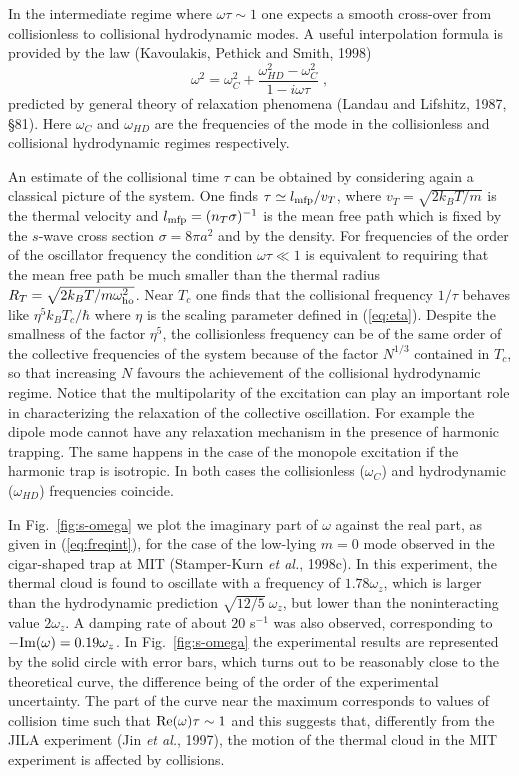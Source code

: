 In the intermediate regime where $\omega\tau\sim 1$ one expects a smooth
cross-over from collisionless to collisional hydrodynamic modes. A useful 
interpolation  formula is provided by  the law (Kavoulakis, Pethick 
and Smith, 1998)
\begin{equation}
\omega^2 = \omega_C^2 + \frac{\omega_{HD}^2-\omega_C^2}{1-i\omega\tau} \;,
\label{eq:freqint}
\end{equation}
predicted by general theory of relaxation phenomena (Landau and Lifshitz, 
1987, \S 81). Here $\omega_C$ and $\omega_{HD}$ are the frequencies of the 
mode in the collisionless and collisional hydrodynamic regimes respectively. 

An estimate of the collisional time  $\tau$ can be obtained by
considering again  a classical picture of the system. One finds $\tau
\simeq l_{\rm mfp}/v_T$, where $v_T=\sqrt{2k_BT/m}$ is the thermal 
velocity and $l_{\rm mfp}=(n_T\sigma)^{-1}$ is the mean free path
which is fixed by the $s$-wave cross section $\sigma=8\pi a^2$ and by
the density. For frequencies of the order of the oscillator frequency
the condition $\omega\tau\ll 1$ is equivalent to requiring that the
mean free path be much  smaller than the thermal radius $R_T=
\sqrt{2k_BT/m\omega_{\rm ho}^2}$. Near $T_c$ one finds that the 
collisional frequency $1/\tau$ behaves like $\eta^5k_BT_c/\hbar$ 
where $\eta$ is the scaling parameter defined in (\ref{eq:eta}). 
Despite the smallness of the factor $\eta^5$, the collisionless 
frequency can be of the same order of the collective frequencies 
of the system because of the factor $N^{1/3}$ contained in $T_c$, 
so that increasing $N$ favours the achievement of the collisional 
hydrodynamic regime. Notice that the
multipolarity of the excitation can play an important role in
characterizing the relaxation of the collective oscillation. For
example the dipole mode cannot have any relaxation mechanism in the
presence of harmonic trapping. The same happens in the case of the
monopole excitation if the harmonic trap is isotropic. In both
cases the collisionless ($\omega_C$) and hydrodynamic ($\omega_{HD}$)
frequencies coincide.

In Fig.~\ref{fig:s-omega} we plot the imaginary part of $\omega$ 
against the real part, as given in (\ref{eq:freqint}), for the 
case of the low-lying $m=0$ mode observed in the cigar-shaped trap
at MIT (Stamper-Kurn {\it et al.}, 1998c). In this experiment, the
thermal cloud is found to oscillate with a frequency of 
$1.78 \omega_z$, which is larger than the hydrodynamic prediction 
$\sqrt{12/5}\ \omega_z$, but lower  than the noninteracting value 
$2\omega_z$. A damping rate of about $20$ s$^{-1}$ was also 
observed, corresponding to $-{\rm Im}(\omega) = 0.19 \omega_z$.  
In Fig.~\ref{fig:s-omega} the experimental results are represented
by the solid circle with error bars, which turns out to be reasonably 
close to the theoretical curve, the difference being of the order of the 
experimental uncertainty. The part of the curve near the maximum 
corresponds to values of collision time such that ${\rm Re}(\omega)
\tau \sim 1$ and this suggests that, differently from the JILA 
experiment (Jin {\it et al.}, 1997), the motion of the thermal 
cloud in the MIT experiment is affected by collisions. 

